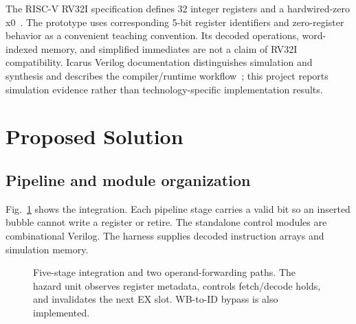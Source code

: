 \documentclass[conference]{IEEEtran}
\begin{document}
The RISC-V RV32I specification defines 32 integer registers and a hardwired-zero x0~\cite{riscv}. The prototype uses corresponding 5-bit register identifiers and zero-register behavior as a convenient teaching convention. Its decoded operations, word-indexed memory, and simplified immediates are not a claim of RV32I compatibility. Icarus Verilog documentation distinguishes simulation and synthesis and describes the compiler/runtime workflow~\cite{icarus}; this project reports simulation evidence rather than technology-specific implementation results.

\section{Proposed Solution}
\subsection{Pipeline and module organization}
Fig.~\ref{fig:architecture} shows the integration. Each pipeline stage carries a valid bit so an inserted bubble cannot write a register or retire. The standalone control modules are combinational Verilog. The harness supplies decoded instruction arrays and simulation memory.

\begin{figure}[t]
\centering
{}
\caption{Five-stage integration and two operand-forwarding paths. The hazard unit observes register metadata, controls fetch/decode holds, and invalidates the next EX slot. WB-to-ID bypass is also implemented.}
\label{fig:architecture}
\end{figure}
\end{document}
